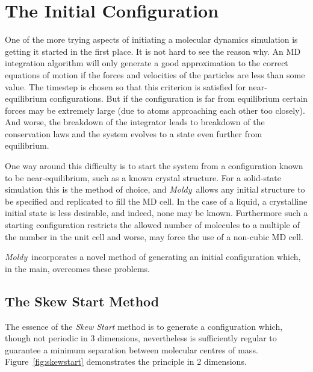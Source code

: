 \documentclass[twoside]{report}
\newcommand{\moldy}{{\em Moldy}}
\begin{document}
\section{The Initial Configuration}%
One of the more trying aspects of initiating a molecular dynamics
simulation is getting it started in the first place.  It is not hard
to see the reason why.  An MD integration algorithm will only generate
a good approximation to the correct equations of motion if the forces
and velocities of the particles are less than some value.  The
timestep is chosen so that this criterion is satisfied for
near-equilibrium configurations.  But if the configuration is far from
equilibrium certain forces may be extremely large (due to atoms
approaching each other too closely).  And worse, the breakdown of the
integrator leads to breakdown of the conservation laws and the
system evolves to a state even further from equilibrium.

One way around this difficulty is to start the system from a
configuration known to be near-equilibrium, such as a known crystal
structure.   For a solid-state simulation this is the method of
choice, and \moldy\ allows any initial structure to be specified and
replicated to fill the MD cell.  In the case of a liquid, a
crystalline initial state is less desirable, and indeed, none may be
known.  Furthermore such a starting configuration restricts the
allowed number of molecules to a multiple of the number in the unit
cell and worse, may force the use of a non-cubic MD cell.

\moldy\ incorporates a novel method of generating an initial
configuration which, in the main, overcomes these problems.
\subsection{The Skew Start Method}
\label{sec:skewstart}
The essence of the {\em Skew Start\/} method is to generate a
configuration which, though not periodic in 3 dimensions, nevertheless
is sufficiently regular to guarantee a minimum separation between
molecular centres of mass.  Figure~\ref{fig:skewstart} demonstrates
the principle in 2 dimensions.
\end{document}
